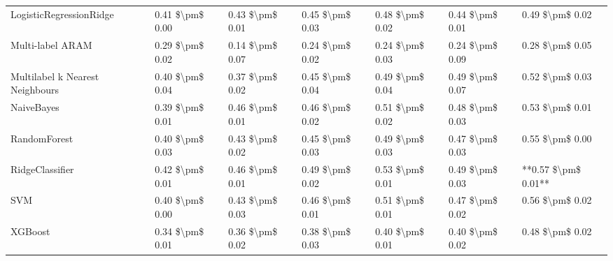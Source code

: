 \begin{tabular}{lllllll}
        LogisticRegressionRidge & 0.41 \$\textbackslash pm\$ 0.00 &           0.43 \$\textbackslash pm\$ 0.01 &       0.45 \$\textbackslash pm\$ 0.03 &        0.48 \$\textbackslash pm\$ 0.02 &                         0.44 \$\textbackslash pm\$ 0.01 &     0.49 \$\textbackslash pm\$ 0.02 \\
               Multi-label ARAM & 0.29 \$\textbackslash pm\$ 0.02 &           0.14 \$\textbackslash pm\$ 0.07 &       0.24 \$\textbackslash pm\$ 0.02 &        0.24 \$\textbackslash pm\$ 0.03 &                         0.24 \$\textbackslash pm\$ 0.09 &     0.28 \$\textbackslash pm\$ 0.05 \\
Multilabel k Nearest Neighbours & 0.40 \$\textbackslash pm\$ 0.04 &           0.37 \$\textbackslash pm\$ 0.02 &       0.45 \$\textbackslash pm\$ 0.04 &        0.49 \$\textbackslash pm\$ 0.04 &                         0.49 \$\textbackslash pm\$ 0.07 &     0.52 \$\textbackslash pm\$ 0.03 \\
                     NaiveBayes & 0.39 \$\textbackslash pm\$ 0.01 &           0.46 \$\textbackslash pm\$ 0.01 &       0.46 \$\textbackslash pm\$ 0.02 &        0.51 \$\textbackslash pm\$ 0.02 &                         0.48 \$\textbackslash pm\$ 0.03 &     0.53 \$\textbackslash pm\$ 0.01 \\
                   RandomForest & 0.40 \$\textbackslash pm\$ 0.03 &           0.43 \$\textbackslash pm\$ 0.02 &       0.45 \$\textbackslash pm\$ 0.03 &        0.49 \$\textbackslash pm\$ 0.03 &                         0.47 \$\textbackslash pm\$ 0.03 &     0.55 \$\textbackslash pm\$ 0.00 \\
                RidgeClassifier & 0.42 \$\textbackslash pm\$ 0.01 &           0.46 \$\textbackslash pm\$ 0.01 &       0.49 \$\textbackslash pm\$ 0.02 &        0.53 \$\textbackslash pm\$ 0.01 &                         0.49 \$\textbackslash pm\$ 0.03 & **0.57 \$\textbackslash pm\$ 0.01** \\
                            SVM & 0.40 \$\textbackslash pm\$ 0.00 &           0.43 \$\textbackslash pm\$ 0.03 &       0.46 \$\textbackslash pm\$ 0.01 &        0.51 \$\textbackslash pm\$ 0.01 &                         0.47 \$\textbackslash pm\$ 0.02 &     0.56 \$\textbackslash pm\$ 0.02 \\
                        XGBoost & 0.34 \$\textbackslash pm\$ 0.01 &           0.36 \$\textbackslash pm\$ 0.02 &       0.38 \$\textbackslash pm\$ 0.03 &        0.40 \$\textbackslash pm\$ 0.01 &                         0.40 \$\textbackslash pm\$ 0.02 &     0.48 \$\textbackslash pm\$ 0.02 \\
\bottomrule
\end{tabular}
